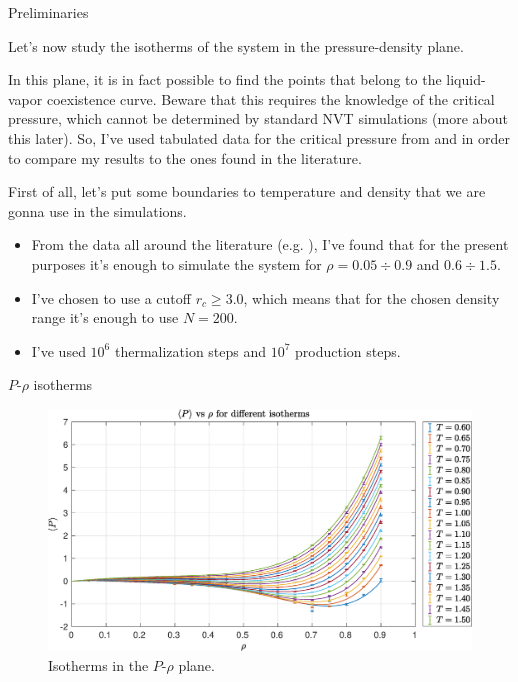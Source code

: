 \documentclass[10pt, compress, protectframetitle, handout]{beamer}
\begin{document}
\begin{frame}[allowframebreaks]{Preliminaries}

	Let's now study the isotherms of the system in the pressure-density plane.
	
	In this plane, it is in fact possible to find the points that belong to the \alert{liquid-vapor coexistence curve}. Beware that this requires the knowledge of the critical pressure, which cannot be determined by standard NVT simulations (more about this later). So, I've used tabulated data for the critical pressure from \cite{Johnson1993} and \cite{Siderius2012} in order to compare my results to the ones found in the literature.
	
	First of all, let's put some boundaries to temperature and density that we are gonna use in the simulations.
	\begin{itemize}
		\item From the data all around the literature (e.g. \cite{Johnson1993}), I've found that for the present purposes it's enough to simulate the system for $\rho = 0.05 \div 0.9$ and $0.6 \div 1.5$.
		\item I've chosen to use a cutoff $r_c \geq 3.0$, which means that for the chosen density range it's enough to use $N=200$.
		\item I've used $10^6$ thermalization steps and $10^7$ production steps.
	\end{itemize}
	

\end{frame}

\begin{frame}{$P$-$\rho$ isotherms}

	\begin{figure}
		\centering
		\includegraphics[width=\textwidth]{PvsRho}
		\caption{Isotherms in the $P$-$\rho$ plane.}
		\label{fig:P_vs_Rho}
	\end{figure}

\end{frame}
\end{document}
